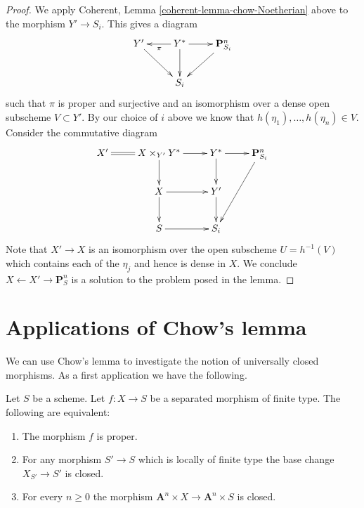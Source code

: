 \begin{proof}
\medskip\noindent
We apply
Coherent, Lemma \ref{coherent-lemma-chow-Noetherian} above to the morphism
$Y' \to S_i$. This gives a diagram
$$
\xymatrix{
Y' \ar[rd] & Y^* \ar[d] \ar[l]^\pi \ar[r] & \mathbf{P}^n_{S_i} \ar[dl] \\
& S_i &
}
$$
such that $\pi$ is proper and surjective and an isomorphism over
a dense open subscheme $V \subset Y'$. By our choice of $i$ above
we know that $h(\eta_1), \ldots, h(\eta_n) \in V$. Consider
the commutative diagram
$$
\xymatrix{
X' \ar@{=}[r] &
X \times_{Y'} Y^* \ar[r] \ar[d] &
Y^* \ar[r] \ar[d] &
\mathbf{P}^n_{S_i} \ar[ddl] \\
& X \ar[r] \ar[d] & Y' \ar[d] & \\
& S \ar[r] & S_i &
}
$$
Note that $X' \to X$ is an isomorphism over the open subscheme
$U = h^{-1}(V)$ which contains each of the $\eta_j$ and hence is
dense in $X$. We conclude $X \leftarrow X' \rightarrow \mathbf{P}^n_S$
is a solution to the problem posed in the lemma.
\end{proof}













\section{Applications of Chow's lemma}
\label{section-apply-chow}

\noindent
We can use Chow's lemma to investigate the notion of universally closed
morphisms. As a first application we have the following.

\begin{lemma}
\label{lemma-limited-base-change}
Let $S$ be a scheme.
Let $f : X \to S$ be a separated morphism of finite type.
The following are equivalent:
\begin{enumerate}
\item The morphism $f$ is proper.
\item For any morphism $S' \to S$ which is locally of finite type
the base change $X_{S'} \to S'$ is closed.
\item For every $n \geq 0$ the morphism
$\mathbf{A}^n \times X \to \mathbf{A}^n \times S$ is closed.
\end{enumerate}
\end{lemma}

